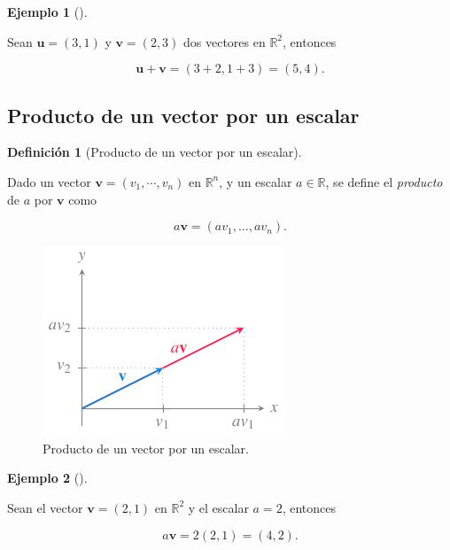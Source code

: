 \documentclass[
  a4paper,
]{scrreport}
\theoremstyle{definition}
\newtheorem{example}{Ejemplo}[chapter]
\theoremstyle{plain}
\theoremstyle{plain}
\theoremstyle{plain}
\theoremstyle{definition}
\newtheorem{definition}{Definición}[chapter]
\theoremstyle{remark}
\begin{document}
\begin{example}[]\protect\hypertarget{exm-suma-vectores}{}\label{exm-suma-vectores}

Sean \(\mathbf{u}=(3,1)\) y \(\mathbf{v}=(2,3)\) dos vectores en
\(\mathbb{R}^2\), entonces

\[
\mathbf{u}+\mathbf{v} = (3+2,1+3) = (5,4).
\]

\end{example}

\hypertarget{producto-de-un-vector-por-un-escalar}{%
\subsection{Producto de un vector por un
escalar}\label{producto-de-un-vector-por-un-escalar}}

\begin{definition}[Producto de un vector por un
escalar]\protect\hypertarget{def-producto-por-escalar}{}\label{def-producto-por-escalar}

Dado un vector \(\mathbf{v}=(v_1,\cdots,v_n)\) en \(\mathbb{R}^n\), y un
escalar \(a\in \mathbb{R}\), se define el \emph{producto} de \(a\) por
\(\mathbf{v}\) como

\[
a\mathbf{v} = (av_1,\ldots, av_n).
\]

\end{definition}

\begin{figure}

{\centering \includegraphics{img/geometria-plano-espacio/producto-vector-por-escalar.pdf}

}

\caption{Producto de un vector por un escalar.}

\end{figure}

\begin{example}[]\protect\hypertarget{exm-producto-por-escalar}{}\label{exm-producto-por-escalar}

Sean el vector \(\mathbf{v}=(2,1)\) en \(\mathbb{R}^2\) y el escalar
\(a=2\), entonces

\[
a\mathbf{v} = 2(2,1) = (4,2).
\]

\end{example}
\end{document}
